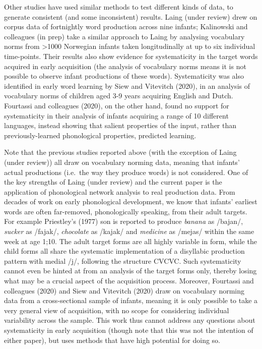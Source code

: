 \documentclass[
  man]{apa6}
\begin{document}
Other studies have used similar methods to test different kinds of data, to generate consistent (and some inconsistent) results. Laing (under review) drew on corpus data of fortnightly word production across nine infants; Kalinowski and colleagues (in prep) take a similar approach to Laing by analysing vocabulary norms from \textgreater1000 Norwegian infants taken longitudinally at up to six individual time-points. Their results also show evidence for systematicity in the target words acquired in early acquisition (the analysis of vocabulary norms means it is not possible to observe infant productions of these words). Systematicity was also identified in early word learning by Siew and Vitevitch (2020), in an analysis of vocabulary norms of children aged 3-9 years acquiring English and Dutch. Fourtassi and colleagues (2020), on the other hand, found no support for systematicity in their analysis of infants acquiring a range of 10 different languages, instead showing that salient properties of the input, rather than previously-learned phonological properties, predicted learning.

Note that the previous studies reported above (with the exception of Laing (under review)) all draw on vocabulary norming data, meaning that infants' actual productions (i.e.~the way they produce words) is not considered. One of the key strengths of Laing (under review) and the current paper is the application of phonological network analysis to real production data. From decades of work on early phonological development, we know that infants' earliest words are often far-removed, phonologically speaking, from their adult targets. For example Priestley's (1977) son is reported to produce \emph{banana} as /bajan/, \emph{sucker} as /fajak/, \emph{chocolate} as /kajak/ and \emph{medicine} as /mejas/ within the same week at age 1;10. The adult target forms are all highly variable in form, while the child forms all share the systematic implementation of a disyllabic production pattern with medial /j/, following the structure CVCVC. Such systematicity cannot even be hinted at from an analysis of the target forms only, thereby losing what may be a crucial aspect of the acquisition process. Moreover, Fourtassi and colleagues (2020) and Siew and Vitevitch (2020) draw on vocabulary norming data from a cross-sectional sample of infants, meaning it is only possible to take a very general view of acquisition, with no scope for considering individual variability across the sample. This work thus cannot address any questions about systematicity in early acquisition (though note that this was not the intention of either paper), but uses methods that have high potential for doing so.
\end{document}

